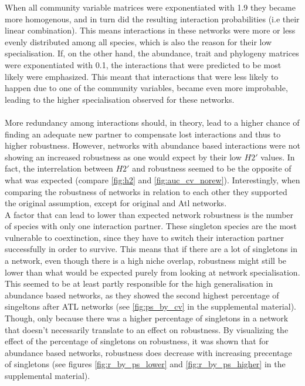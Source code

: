 \documentclass[12pt,a4paper]{article}
\begin{document}
When all community variable matrices were exponentiated with 1.9 they became more homogenous, and in turn did the resulting interaction probabilities (i.e their linear combination). This means interactions in these networks were more or less evenly distributed among all species, which is also the reason for their low specialisation. If, on the other hand, the abundance, trait and phylogeny matrices were exponentiated with 0.1, the interactions that were predicted to be most likely were emphasized. This meant that interactions that were less likely to happen due to one of the community variables, became even more improbable, leading to the higher specialisation observed for these networks. 
\paragraph{}

More redundancy among interactions should, in theory, lead to a higher chance of finding an adequate new partner to compensate lost interactions and thus to higher robustness. However, networks with abundance based interactions were not showing an increased robustness as one would expect by their low $H2'$ values. In fact, the interrelation between $H2'$ and robustness seemed to be the opposite of what was expected (compare \ref{fig:h2} and \ref{fig:auc_cv_norew}). Interestingly, when comparing the robustness of networks in relation to each other they supported the original assumption, except for original and Atl networks.\\ A factor that can lead to lower than expected network robustness is the number of species with only one interaction partner. These singleton species are the most vulnerable to coextinction, since they have to switch their interaction partner successfully in order to survive. This means that if there are a lot of singletons in a network, even though there is a high niche overlap, robustness might still be lower than what would be expected purely from looking at network specialisation. This seemed to be at least partly responsible for the high generalisation in abundance based networks, as they showed the second highest percentage of singeltons after ATL networks (see \ref{fig:ps_by_cv} in the supplemental material). Though, only because there was a higher percentage of singletons in a network that doesn't necessarily translate to an effect on robustness. By visualizing the effect of the percentage of singletons on robustness, it was shown that for abundance based networks, robustness does decrease with increasing precentage of singletons (see figures \ref{fig:r_by_ps_lower} and \ref{fig:r_by_ps_higher} in the supplemental material).
\end{document}
